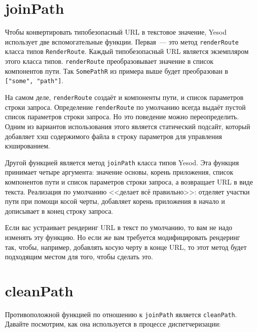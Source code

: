 \section {joinPath}

Чтобы конвертировать типобезопасный URL в текстовое значение, Yesod использует
две вспомогательные функции. Первая~--- это метод \lstinline!renderRoute!
класса типов \lstinline!RenderRoute!. Каждый типобезопасный URL является
экземпляром этого класса типов. \lstinline!renderRoute! преобразовывает
значение в список компонентов пути. Так \lstinline!SomePathR! из примера выше
будет преобразован в \lstinline!["some", "path"]!.

\begin{remark}
    На самом деле, \lstinline!renderRoute! создаёт и компоненты пути, и список
    параметров строки запроса. Определение \lstinline!renderRoute! по умолчанию
    всегда выдаёт пустой список параметров строки запроса. Но это поведение
    можно переопределить. Одним из вариантов использования этого является
    статический подсайт, который добавляет хэш содержимого файла в строку
    параметров для управления кэшированием.
\end{remark}

Другой функцией является метод \lstinline!joinPath! класса типов Yesod. Эта
функция принимает четыре аргумента: значение основы, корень приложения, список
компонентов пути и список параметров строки запроса, а возвращает URL в виде
текста. Реализация по умолчанию <<делает всё правильно>>: отделяет участки пути
при помощи косой черты, добавляет корень приложения в начало и дописывает в
конец строку запроса.

Если вас устраивает рендеринг URL в текст по умолчанию, то вам не надо изменять
эту функцию. Но если же вам требуется модифицировать рендеринг так, чтобы,
например, добавлять косую черту в конце URL, то этот метод будет подходящим
местом для того, чтобы сделать это.

\section {cleanPath}

Противоположной функцией по отношению к \lstinline!joinPath! является
\lstinline!cleanPath!. Давайте посмотрим, как она используется в процессе
диспетчеризации:

